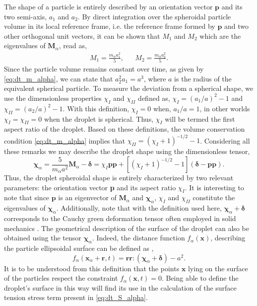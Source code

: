 The shape of a particle is entirely described by an orientation vector $\textbf{p}$ and its two semi-axis, $a_1$ and $a_2$.  
By direct integration over the spheroidal particle volume in its local reference frame, i.e. the reference frame formed by $\textbf{p}$ and two other orthogonal unit vectors, it can be shown that $M_1$ and $M_2$ which are the eigenvalues of $\textbf{M}_\alpha$, read as,
\begin{align*}
    M_1 = \frac{m_\alpha a_1^2}{5},
    && M_2 = \frac{m_\alpha a_2^2}{5}.
\end{align*}
Since the particle volume remains constant over time, as given by  \ref{eq:dt_m_alpha}, we can state that $a_2^2 a_1 =a^3$, where $a$ is the radius of the equivalent spherical particle.
To measure the deviation from a spherical shape, we use the dimensionless properties $\chi_I$ and $\chi_{II}$ defined as, $\chi_I = (a_1/a)^2 - 1$ and $\chi_{II} = (a_2/a)^2 - 1$. 
With this definition, $\chi_I = 0$ when, $a_1/a =1$, in other worlds $\chi_I =\chi_{II} = 0$ when the droplet is spherical. 
Thus, $\chi_I$ will be termed the first aspect ratio of the droplet.  
Based on these definitions, the volume conservation condition \eqref{eq:dt_m_alpha} implies that $\chi_{II} = (\chi_I + 1)^{-1/2} - 1$.
Considering all these remarks we may describe the droplet shape using the dimensionless tensor, 
\begin{equation*}
    \bm\chi_\alpha
    = \frac{5}{m_\alpha a^2}\textbf{M}_\alpha - \bm\delta
    = \chi_I \textbf{pp}
        +[(\chi_I + 1)^{-1/2} - 1 ] (\bm\delta - \textbf{pp}). 
\end{equation*}
Thus, the droplet spheroidal shape is entirely characterized by two relevant parameters: the orientation vector \textbf{p} and its aspect ratio $\chi_I$.
It is interesting to note that since $\textbf{p}$ is an eigenvector of $\textbf{M}_\alpha$ and $\bm\chi_\alpha$, $\chi_I$ and $\chi_{II}$ constitute the eigenvalues of $\bm\chi_\alpha$. 
Additionally, note that with the definition used here, $\bm\chi_\alpha +\bm\delta$ corresponds to the Cauchy green deformation tensor often employed in solid mechanics \citep{mwasame2018macroscopic}. 
The geometrical description of the surface of the droplet can also be obtained using the tensor $\bm\chi_\alpha$. 
Indeed, the distance function  $f_\alpha(\textbf{x})$, describing the particle ellipsoidal surface can be defined as \citep{nadim1996concise},  
\begin{equation*}
    f_\alpha(\textbf{x}_\alpha +\textbf{r},t) = \textbf{rr}:(\bm\chi_\alpha +\bm\delta)-a^2.  
    \label{eq:distance_function}
\end{equation*}
It is to be understood from this definition that the points $\textbf{x}$ lying on the surface of the particles respect the constraint $f_\alpha(\textbf{x},t) = 0$. 
Being able to define the droplet's surface in this way will find its use in the calculation of the surface tension stress term present in \ref{eq:dt_S_alpha}. 

